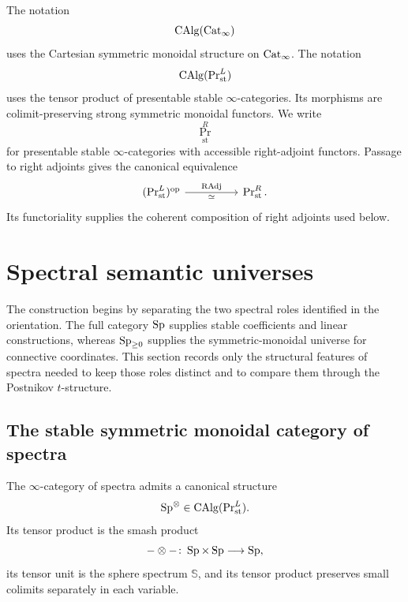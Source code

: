 \begin{convention}
\label{conv:spectral-monoidal-structures-on-categories}
The notation
\[
    \operatorname{CAlg}(\operatorname{Cat}_\infty)
\]
uses the Cartesian symmetric monoidal structure on $\operatorname{Cat}_\infty$.
The notation
\[
    \operatorname{CAlg}(\operatorname{Pr}^L_{\mathrm{st}})
\]
uses the tensor product of presentable stable $\infty$-categories. Its
morphisms are colimit-preserving strong symmetric monoidal functors. We write
\[
    \Pr^R_{\mathrm{st}}
\]
for presentable stable $\infty$-categories with accessible right-adjoint
functors. Passage to right adjoints gives the canonical equivalence
\[
\begin{tikzcd}[column sep=huge]
    (\Pr^L_{\mathrm{st}})^{\op}
        \arrow[r, "{\operatorname{RAdj}}", "\simeq"']
    &
    \Pr^R_{\mathrm{st}}.
\end{tikzcd}
\]
Its functoriality supplies the coherent composition of right adjoints used
below.
\end{convention}

\section{Spectral semantic universes}
\label{sec:spectra-postnikov-structure}

The construction begins by separating the two spectral roles identified in
the orientation. The full category \(\operatorname{Sp}\) supplies stable coefficients and
linear constructions, whereas \(\operatorname{Sp}_{\geq0}\) supplies the
symmetric-monoidal universe for connective coordinates. This section records
only the structural features of spectra needed to keep those roles distinct
and to compare them through the Postnikov \(t\)-structure.

\subsection{The stable symmetric monoidal category of spectra}

\begin{proposition}
\label{prop:spectra-presentably-stable-monoidal}
The $\infty$-category of spectra admits a canonical structure
\[
    \operatorname{Sp}^\otimes
    \in
    \operatorname{CAlg}(\operatorname{Pr}^L_{\mathrm{st}}).
\]
Its tensor product is the smash product
\[
    -\otimes-
    \colon
    \operatorname{Sp}\times\operatorname{Sp}
    \longrightarrow
    \operatorname{Sp},
\]
its tensor unit is the sphere spectrum $\mathbb S$, and its tensor product
preserves small colimits separately in each variable.
\end{proposition}

